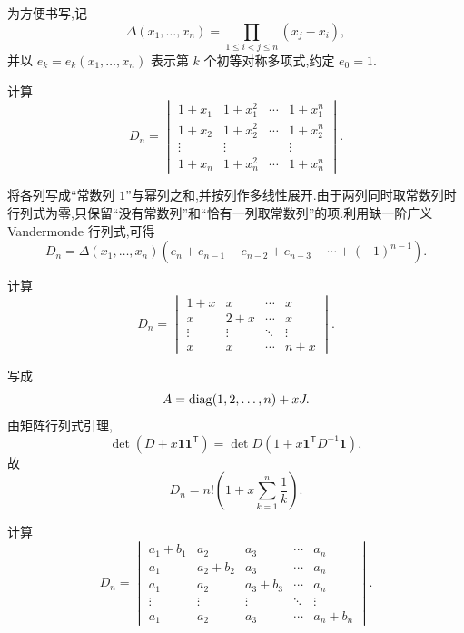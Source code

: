 为方便书写,记
\[
\Delta(x_1,\ldots,x_n)
=
\prod\limits_{1\leq i<j\leq n}(x_j-x_i),
\]
并以 $e_k=e_k(x_1,\ldots,x_n)$ 表示第 $k$ 个初等对称多项式,约定 $e_0=1$.

\begin{example}
计算
\[
D_n=
\begin{vmatrix}
1+x_1&1+x_1^2&\cdots&1+x_1^n\\
1+x_2&1+x_2^2&\cdots&1+x_2^n\\
\vdots&\vdots&&\vdots\\
1+x_n&1+x_n^2&\cdots&1+x_n^n
\end{vmatrix}.
\]
\end{example}
\exampleblank

\begin{solution}
将各列写成``常数列 $1$''与幂列之和,并按列作多线性展开.由于两列同时取常数列时行列式为零,只保留``没有常数列''和``恰有一列取常数列''的项.利用缺一阶广义 Vandermonde 行列式,可得
\[
\boxed{
D_n
=
\Delta(x_1,\ldots,x_n)
\left(
e_n+e_{n-1}-e_{n-2}+e_{n-3}-\cdots+(-1)^{n-1}
\right)
}.
\]
\end{solution}


\begin{example}
计算
\[
D_n=
\begin{vmatrix}
1+x&x&\cdots&x\\
x&2+x&\cdots&x\\
\vdots&\vdots&\ddots&\vdots\\
x&x&\cdots&n+x
\end{vmatrix}.
\]
\end{example}
\exampleblank

\begin{solution}
写成
\[
A=\operatorname{diag}(1,2,\ldots,n)+xJ.
\]
由矩阵行列式引理,
\[
\det(D+x\boldsymbol{1}\boldsymbol{1}^{\mathsf T})
=
\det D
\left(
1+x\boldsymbol{1}^{\mathsf T}D^{-1}\boldsymbol{1}
\right),
\]
故
\[
\boxed{
D_n
=
n!
\left(
1+x\sum\limits_{k=1}^{n}\dfrac{1}{k}
\right)
}.
\]
\end{solution}


\begin{example}
计算
\[
D_n=
\begin{vmatrix}
a_1+b_1&a_2&a_3&\cdots&a_n\\
a_1&a_2+b_2&a_3&\cdots&a_n\\
a_1&a_2&a_3+b_3&\cdots&a_n\\
\vdots&\vdots&\vdots&\ddots&\vdots\\
a_1&a_2&a_3&\cdots&a_n+b_n
\end{vmatrix}.
\]
\end{example}
\exampleblank

